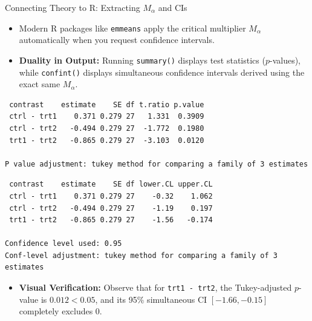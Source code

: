 \begin{frame}{Connecting Theory to R: Extracting $M_{\alpha}$ and CIs}
  \begin{itemize}
    \item Modern R packages like \texttt{emmeans} apply the critical multiplier $M_{\alpha}$ automatically when you request confidence intervals.
    \item \textbf{Duality in Output:} Running \texttt{summary()} displays test statistics ($p$-values), while \texttt{confint()} displays simultaneous confidence intervals derived using the exact same $M_{\alpha}$.
  \end{itemize}

\begin{knitrout}\small
{}\color{fgcolor}\begin{kframe}
\begin{alltt}
 \hlkwb{<-}  \hlopt{~}   
   \hlkwb{<-}  \hlopt{~} 
 \hlkwb{<-}   \hldef{=} \hldef{)}

\end{alltt}
\begin{verbatim}
 contrast    estimate    SE df t.ratio p.value
 ctrl - trt1    0.371 0.279 27   1.331  0.3909
 ctrl - trt2   -0.494 0.279 27  -1.772  0.1980
 trt1 - trt2   -0.865 0.279 27  -3.103  0.0120

P value adjustment: tukey method for comparing a family of 3 estimates 
\end{verbatim}
\begin{alltt}
\end{alltt}
\begin{verbatim}
 contrast    estimate    SE df lower.CL upper.CL
 ctrl - trt1    0.371 0.279 27    -0.32    1.062
 ctrl - trt2   -0.494 0.279 27    -1.19    0.197
 trt1 - trt2   -0.865 0.279 27    -1.56   -0.174

Confidence level used: 0.95 
Conf-level adjustment: tukey method for comparing a family of 3 estimates 
\end{verbatim}
\end{kframe}
\end{knitrout}

  \begin{itemize}
    \item \textbf{Visual Verification:} Observe that for \texttt{trt1 - trt2}, the Tukey-adjusted $p$-value is $0.012 < 0.05$, and its 95\% simultaneous CI $[-1.66, -0.15]$ completely excludes $0$.
  \end{itemize}
\end{frame}

